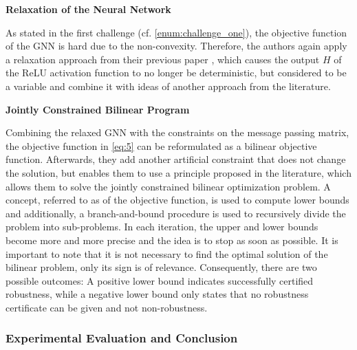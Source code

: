 \documentclass[a4paper,preprint]{sig-alternate}
\begin{document}
\textbf{Relaxation of the Neural Network}\newline

As stated in the first challenge (cf. \ref{enum:challenge_one}), the objective function of the GNN is hard due to the non-convexity.
Therefore, the authors again apply a relaxation approach from their previous paper \cite{Zuegner_2019}, which causes the output $H$ 
of the ReLU activation function to no longer be deterministic, but considered to be a variable and combine it with ideas
of another approach from the literature.\newline

\textbf{Jointly Constrained Bilinear Program}\newline

Combining the relaxed GNN with the constraints on the message passing matrix, the objective function in \ref{eq:5} 
can be reformulated as a bilinear objective function. \cite{10.1145/3394486.3403217}
Afterwards, they add another artificial constraint that does not change the solution, but enables them to use 
a principle proposed in the literature, which allows them to solve the jointly constrained bilinear optimization problem.
A concept, referred to as  of the objective function, is used to compute lower bounds and additionally, 
a branch-and-bound procedure is used to recursively divide the problem into sub-problems. 
In each iteration, the upper and lower bounds become more and more precise
and the idea is to stop as soon as possible. It is important to note that it is not necessary to find the optimal solution of 
the bilinear problem, only its sign is of relevance. \cite{10.1145/3394486.3403217}
Consequently, there are two possible outcomes: A positive lower bound indicates successfully certified robustness, while a negative
lower bound only states that no robustness certificate can be given and not non-robustness. \cite{10.1145/3394486.3403217}

\subsubsection{Experimental Evaluation and Conclusion}
\end{document}

